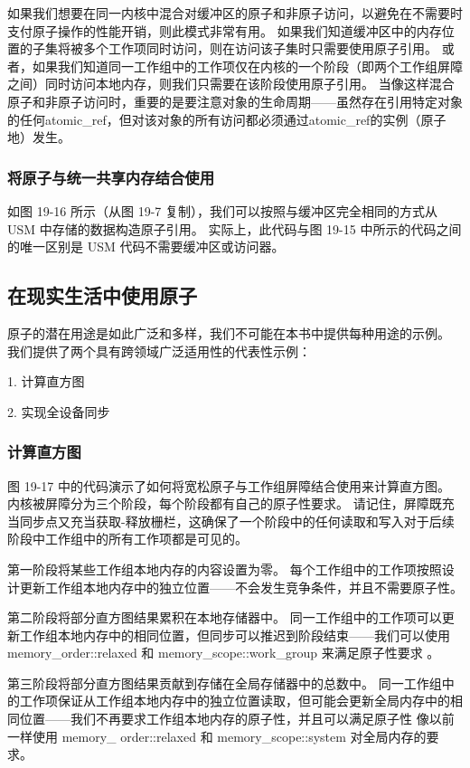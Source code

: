 如果我们想要在同一内核中混合对缓冲区的原子和非原子访问，以避免在不需要时支付原子操作的性能开销，则此模式非常有用。 如果我们知道缓冲区中的内存位置的子集将被多个工作项同时访问，则在访问该子集时只需要使用原子引用。 或者，如果我们知道同一工作组中的工作项仅在内核的一个阶段（即两个工作组屏障之间）同时访问本地内存，则我们只需要在该阶段使用原子引用。 当像这样混合原子和非原子访问时，重要的是要注意对象的生命周期——虽然存在引用特定对象的任何atomic\_ref，但对该对象的所有访问都必须通过atomic\_ref的实例（原子地）发生。

\subsubsection{将原子与统一共享内存结合使用}
如图 19-16 所示（从图 19-7 复制），我们可以按照与缓冲区完全相同的方式从 USM 中存储的数据构造原子引用。 实际上，此代码与图 19-15 中所示的代码之间的唯一区别是 USM 代码不需要缓冲区或访问器。

\subsection{在现实生活中使用原子}
原子的潜在用途是如此广泛和多样，我们不可能在本书中提供每种用途的示例。 我们提供了两个具有跨领域广泛适用性的代表性示例：

1. 计算直方图

2. 实现全设备同步

\subsubsection{计算直方图}
图 19-17 中的代码演示了如何将宽松原子与工作组屏障结合使用来计算直方图。 内核被屏障分为三个阶段，每个阶段都有自己的原子性要求。 请记住，屏障既充当同步点又充当获取-释放栅栏，这确保了一个阶段中的任何读取和写入对于后续阶段中工作组中的所有工作项都是可见的。

第一阶段将某些工作组本地内存的内容设置为零。 每个工作组中的工作项按照设计更新工作组本地内存中的独立位置——不会发生竞争条件，并且不需要原子性。

第二阶段将部分直方图结果累积在本地存储器中。 同一工作组中的工作项可以更新工作组本地内存中的相同位置，但同步可以推迟到阶段结束——我们可以使用 memory\_order::relaxed 和 memory\_scope::work\_group 来满足原子性要求 。

第三阶段将部分直方图结果贡献到存储在全局存储器中的总数中。 同一工作组中的工作项保证从工作组本地内存中的独立位置读取，但可能会更新全局内存中的相同位置——我们不再要求工作组本地内存的原子性，并且可以满足原子性 像以前一样使用 memory\_ order::relaxed 和 memory\_scope::system 对全局内存的要求。


